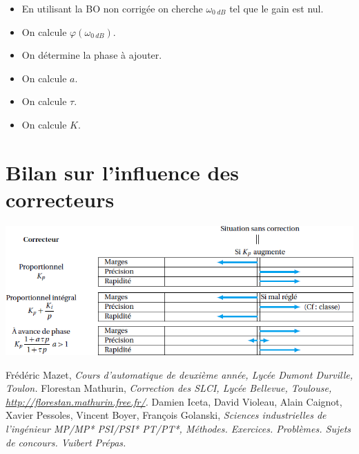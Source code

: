 \documentclass[10pt,fleqn]{article} %
\begin{document}
\begin{methode}
\begin{itemize}
\item En utilisant la BO non corrigée on cherche $\omega_{\SI{0}{dB}}$ tel que le gain est nul.
\item On calcule $\varphi\left(\omega_{\SI{0}{dB}}\right)$. 
\item On détermine la phase à ajouter. 
\item On calcule $a$. 
\item On calcule $\tau$.
\item On calcule $K$. 
\end{itemize}


\end{methode}


\section{Bilan sur l'influence des correcteurs}
\begin{center}
\includegraphics[width=\linewidth]{images/BilanInfluence}
\end{center}

\begin{thebibliography}{2}
    Frédéric Mazet, {\it Cours d'automatique de deuxième année, Lycée Dumont Durville, Toulon.}
       Florestan Mathurin, {\it Correction des SLCI, Lycée Bellevue, Toulouse, \url{http://florestan.mathurin.free.fr/}.}
       Damien Iceta, David Violeau, Alain Caignot, Xavier Pessoles, Vincent Boyer, François Golanski, {\it Sciences industrielles de l'ingénieur MP/MP* PSI/PSI* PT/PT*, Méthodes. Exercices. Problèmes. Sujets de concours. Vuibert Prépas.}



\end{thebibliography}
\end{document}
